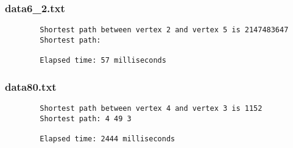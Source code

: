 \documentclass{article}
\begin{document}
    \subsubsection*{data6\_2.txt}
    \begin{verbatim}
        Shortest path between vertex 2 and vertex 5 is 2147483647
        Shortest path:

        Elapsed time: 57 milliseconds
    \end{verbatim}

    \subsubsection*{data80.txt}
    \begin{verbatim}
        Shortest path between vertex 4 and vertex 3 is 1152
        Shortest path: 4 49 3

        Elapsed time: 2444 milliseconds
    \end{verbatim}
\end{document}
